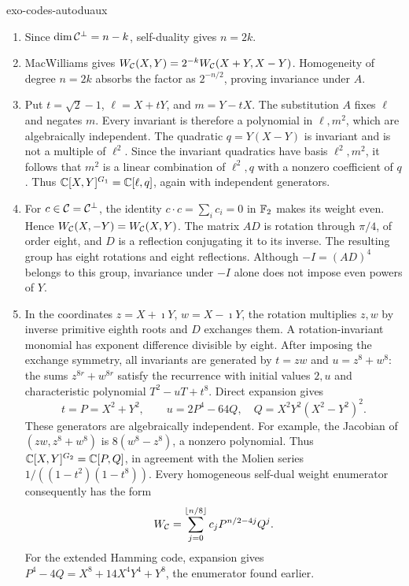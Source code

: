 \begin{correction}{exo-codes-autoduaux}
\begin{enumerate}
\item Since $\dim\mathcal{C}^\perp=n-k$, self-duality gives $n=2k$.
\item MacWilliams gives
$W_{\mathcal{C}}(X,Y)=2^{-k}W_{\mathcal{C}}(X+Y,X-Y)$. Homogeneity of degree $n=2k$
absorbs the factor as $2^{-n/2}$, proving invariance under $A$.
\item Put $t=\sqrt2-1$, $\ell=X+tY$, and $m=Y-tX$.
The substitution $A$ fixes $\ell$ and negates $m$. Every invariant
is therefore a polynomial in $\ell,m^2$, which are algebraically
independent. The quadratic $q=Y(X-Y)$ is invariant and is not a
multiple of $\ell^2$. Since the invariant quadratics have basis
$\ell^2,m^2$, it follows that $m^2$ is a linear combination of
$\ell^2,q$ with a nonzero coefficient of $q$. Thus
$\mathbb{C}[X,Y]^{G_1}=\mathbb{C}[\ell,q]$, again with independent generators.
\item For $c\in\mathcal{C}=\mathcal{C}^\perp$, the identity
$c\cdot c=\sum_i c_i=0$ in $\mathbb{F}_2$ makes its weight even.
Hence $W_{\mathcal{C}}(X,-Y)=W_{\mathcal{C}}(X,Y)$. The matrix $AD$ is rotation
through $\pi/4$, of order eight, and $D$ is a reflection conjugating
it to its inverse. The resulting group has eight rotations and
eight reflections. Although $-I=(AD)^4$ belongs to this group,
invariance under $-I$ alone does not impose even powers of $Y$.
\item In the coordinates $z=X+\imath Y$, $w=X-\imath Y$, the
rotation multiplies $z,w$ by inverse primitive eighth roots and
$D$ exchanges them. A rotation-invariant monomial has exponent
difference divisible by eight. After imposing the exchange symmetry,
all invariants are generated by $t=zw$ and $u=z^8+w^8$:
the sums $z^{8r}+w^{8r}$ satisfy the recurrence with initial values
$2,u$ and characteristic polynomial $T^2-uT+t^8$.
Direct expansion gives
\[
 t=P=X^2+Y^2,\qquad u=2P^4-64Q,
 \quad Q=X^2Y^2(X^2-Y^2)^2.
\]
These generators are algebraically independent. For example, the
Jacobian of $(zw,z^8+w^8)$ is $8(w^8-z^8)$, a nonzero polynomial.
Thus $\mathbb{C}[X,Y]^{G_2}=\mathbb{C}[P,Q]$, in agreement with the Molien series
$1/((1-t^2)(1-t^8))$.
Every homogeneous self-dual weight enumerator consequently has the form
\[
 W_{\mathcal{C}}=\sum_{j=0}^{\lfloor n/8\rfloor}
       c_j P^{n/2-4j}Q^j.
\]
For the extended Hamming code, expansion gives
$P^4-4Q=X^8+14X^4Y^4+Y^8$, the enumerator found earlier.
\end{enumerate}


\end{correction}
